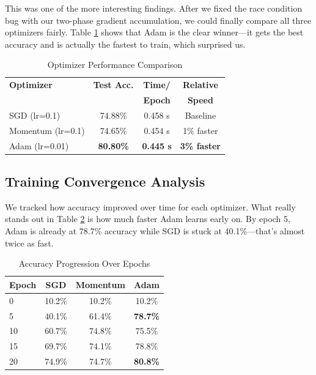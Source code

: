 \documentclass[conference]{IEEEtran}
\begin{document}
This was one of the more interesting findings. After we fixed the race condition bug with our two-phase gradient accumulation, we could finally compare all three optimizers fairly. Table \ref{tab:optimizer} shows that Adam is the clear winner—it gets the best accuracy and is actually the fastest to train, which surprised us.

\begin{table}[htbp]
\caption{Optimizer Performance Comparison}
\begin{center}
\begin{tabular}{lccc}
\toprule
\textbf{Optimizer} & \textbf{Test Acc.} & \textbf{Time/} & \textbf{Relative}\\
& & \textbf{Epoch} & \textbf{Speed}\\
\midrule
SGD (lr=0.1) & 74.88\% & 0.458 s & Baseline \\
Momentum (lr=0.1) & 74.65\% & 0.454 s & 1\% faster \\
Adam (lr=0.01) & \textbf{80.80\%} & \textbf{0.445 s} & \textbf{3\% faster} \\
\bottomrule
\end{tabular}
\label{tab:optimizer}
\end{center}
\end{table}

\subsection{Training Convergence Analysis}

We tracked how accuracy improved over time for each optimizer. What really stands out in Table \ref{tab:convergence} is how much faster Adam learns early on. By epoch 5, Adam is already at 78.7\% accuracy while SGD is stuck at 40.1\%—that's almost twice as fast.

\begin{table}[htbp]
\caption{Accuracy Progression Over Epochs}
\begin{center}
\begin{tabular}{lccc}
\toprule
\textbf{Epoch} & \textbf{SGD} & \textbf{Momentum} & \textbf{Adam}\\
\midrule
0 & 10.2\% & 10.2\% & 10.2\% \\
5 & 40.1\% & 61.4\% & \textbf{78.7\%} \\
10 & 60.7\% & 74.8\% & 75.5\% \\
15 & 69.7\% & 74.1\% & 78.8\% \\
20 & 74.9\% & 74.7\% & \textbf{80.8\%} \\
\bottomrule
\end{tabular}
\label{tab:convergence}
\end{center}
\end{table}
\end{document}
